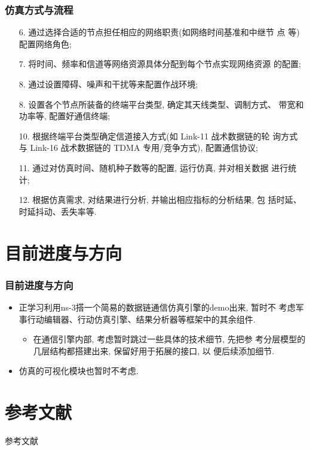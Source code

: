 \documentclass[10pt,mathserif]{beamer}%
\begin{document}
\begin{frame}[fragile]
	\frametitle{仿真方式与流程}
	\setlength{\parindent}{2em}
	\begin{spacing}{1.3}
		\begin{enumerate}
			\item[6.] 通过选择合适的节点担任相应的网络职责(如网络时间基准和中继节
				点 等)配置网络角色;  
			\item[7.] 将时间、频率和信道等网络资源具体分配到每个节点实现网络资源
				的配置;  
			\item[8.] 通过设置障碍、噪声和干扰等来配置作战环境; 
			\item[8.] 设置各个节点所装备的终端平台类型, 确定其天线类型、调制方式、
				带宽和功率等, 配置好通信终端;  
			\item[10.] 根据终端平台类型确定信道接入方式(如 Link-11 战术数据链的轮
				询方式与 Link-16 战术数据链的 TDMA 专用/竞争方式), 配置通信协议;  
			\item[11.] 通过对仿真时间、随机种子数等的配置, 运行仿真, 并对相关数据
				进行统计;  
			\item[12.] 根据仿真需求, 对结果进行分析, 并输出相应指标的分析结果, 包
				括时延、时延抖动、丢失率等. 
		\end{enumerate}
	\end{spacing}
\end{frame}

\section{目前进度与方向}
\begin{frame}[fragile]
	\frametitle{目前进度与方向}
	\setlength{\parindent}{2em}
	\begin{spacing}{1.5}
		\begin{itemize}
			\item 正学习利用ns-3搭一个简易的数据链通信仿真引擎的demo出来, 暂时不
				考虑军事行动编辑器、行动仿真引擎、结果分析器等框架中的其余组件.
				\begin{itemize}
					\item 在通信引擎内部, 考虑暂时跳过一些具体的技术细节, 先把参
						考分层模型的几层结构都搭建出来, 保留好用于拓展的接口, 以
						便后续添加细节.
				\end{itemize}
			\item 仿真的可视化模块也暂时不考虑.
		\end{itemize}
	\end{spacing}
\end{frame}


\section{参考文献}
\begin{frame}{参考文献}
    \begin{tiny}
        
        
    \end{tiny}
\end{frame}


{\xdbg%
\begin{frame}
\end{frame}}
\end{document}
